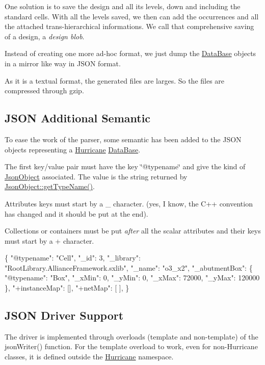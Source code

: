 One solution is to save the design and all it\textquotesingle{}s levels, down and including the standard cells. With all the levels saved, we then can add the occurrences and all the attached trans-\/hierarchical informations. We call that comprehensive saving of a design, a {\itshape design blob}.

Instead of creating one more ad-\/hoc format, we just dump the \mbox{\hyperlink{classHurricane_1_1DataBase}{Data\+Base}} objects in a mirror like way in J\+S\+ON format.

As it is a textual format, the generated files are larges. So the files are compressed through {\ttfamily gzip}.\hypertarget{group__JsonSupport_secJsonSemantic}{}\subsection{J\+S\+O\+N Additional Semantic}\label{group__JsonSupport_secJsonSemantic}
To ease the work of the parser, some semantic has been added to the J\+S\+ON objects representing a \mbox{\hyperlink{namespaceHurricane}{Hurricane}} \mbox{\hyperlink{classHurricane_1_1DataBase}{Data\+Base}}.
\begin{DoxyEnumerate}
\item The first key/value pair must have the key {\ttfamily \char`\"{}@typename\char`\"{}} and give the kind of \mbox{\hyperlink{classHurricane_1_1JsonObject}{Json\+Object}} associated. The value is the string returned by {\ttfamily \mbox{\hyperlink{classHurricane_1_1JsonObject_a947e1c3f8dbae63bb2d086b5b827a2a5}{Json\+Object\+::get\+Type\+Name()}}}.
\item Attributes keys must start by a {\ttfamily \textquotesingle{}\+\_\+\textquotesingle{}} character. (yes, I know, the C++ convention has changed and it should be put at the end).
\item Collections or containers must be put {\itshape after} all the scalar attributes and their keys must start by a {\ttfamily \textquotesingle{}+\textquotesingle{}} character.
\end{DoxyEnumerate}


\begin{DoxyCode}
\{
  "@typename": "Cell",
  "\_id": 3,
  "\_library": "RootLibrary.AllianceFramework.sxlib",
  "\_name": "o3\_x2",
  "\_abutmentBox": \{
    "@typename": "Box",
    "\_xMin": 0,
    "\_yMin": 0,
    "\_xMax": 72000,
    "\_yMax": 120000
  \},
  "+instanceMap": [],
  "+netMap": [
  ],
\}
\end{DoxyCode}
\hypertarget{group__JsonSupport_secJsonDriver}{}\subsection{J\+S\+O\+N Driver Support}\label{group__JsonSupport_secJsonDriver}
The driver is implemented through overloads (template and non-\/template) of the {\ttfamily json\+Writer()} function. For the template overload to work, even for non-\/\+Hurricane classes, it is defined outside the \mbox{\hyperlink{namespaceHurricane}{Hurricane}} namespace.

